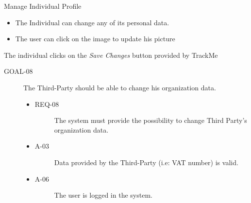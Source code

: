 \documentclass[a4paper]{article}
\newcommand{\requirement}{\ding{229}}%
\begin{document}
      
       \begin{usecase}{Manage Individual Profile}
        {\begin{itemize}
            \item The Individual can change any of its personal data.
            \item The user can click on the image to update his picture
        \end{itemize}}
        {The individual clicks on the \textit{Save Changes} button provided by TrackMe}
       \end{usecase}
       
       \begin{description}
        	\item[GOAL-08] The Third-Party should be able to change his organization data. 
            	\begin{itemize}
            	    \item[\requirement]
                	\begin{description}
                	\item[REQ-08] The system must provide the possibility to change Third Party's organization data. 
                	\end{description}
                	\item
                	\begin{description}
                	\item[A-03] Data provided by the Third-Party (i.e: VAT number) is valid.
                	\end{description}
                	\item
                	\begin{description}
                	\item[A-06] The user is logged in the system.
                	\end{description}
                	\end{itemize}
        \end{description}
       
\end{document}
